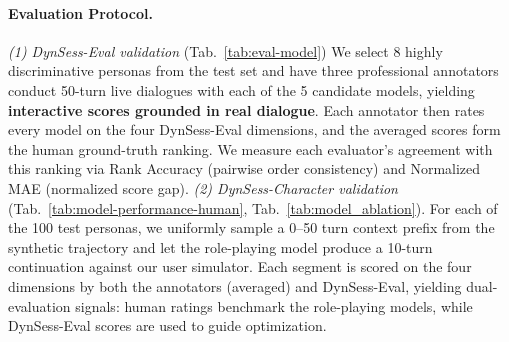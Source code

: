 \paragraph{Evaluation Protocol.}
\textit{(1) DynSess-Eval validation} (Tab.~\ref{tab:eval-model})
 We select 8 highly discriminative personas from the test set and have three professional annotators conduct 50-turn live dialogues with each of the 5 candidate models, yielding \textbf{interactive scores grounded in real dialogue}. Each annotator then rates every model on the four DynSess-Eval dimensions, and the averaged scores form the human ground-truth ranking.
 We measure each evaluator's agreement with this ranking via Rank Accuracy (pairwise order consistency) and Normalized MAE (normalized score gap).
\textit{(2) DynSess-Character validation} (Tab.~\ref{tab:model-performance-human}, Tab.~\ref{tab:model_ablation}). For each of the 100 test personas, we uniformly sample a 0--50 turn context prefix from the synthetic trajectory and let the role-playing model produce a 10-turn continuation against our user simulator.
Each segment is scored on the four dimensions by both the annotators (averaged) and DynSess-Eval, yielding dual-evaluation signals: human ratings benchmark the role-playing models, while DynSess-Eval scores are used to guide optimization.






